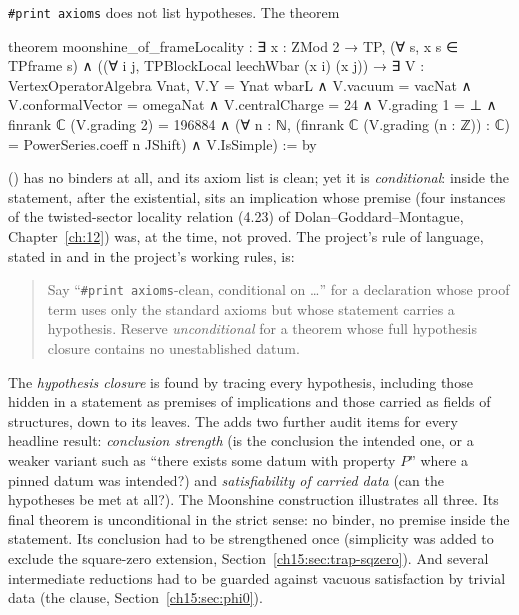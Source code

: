 \texttt{\#print axioms} does not list hypotheses. The theorem
\begin{leancode}
theorem moonshine_of_frameLocality :
    ∃ x : ZMod 2 → TP, (∀ s, x s ∈ TPframe s) ∧
      ((∀ i j, TPBlockLocal leechWbar (x i) (x j)) →
        ∃ V : VertexOperatorAlgebra Vnat,
          V.Y = Ynat wbarL ∧ V.vacuum = vacNat ∧ V.conformalVector = omegaNat ∧
          V.centralCharge = 24 ∧
          V.grading 1 = ⊥ ∧
          finrank ℂ (V.grading 2) = 196884 ∧
          (∀ n : ℕ, (finrank ℂ (V.grading (n : ℤ)) : ℂ) = PowerSeries.coeff n JShift) ∧
          V.IsSimple) := by
\end{leancode}
() has no binders at all, and its axiom list is clean; yet it is
\emph{conditional}: inside the statement, after the existential, sits an implication whose premise
 (four instances of the twisted-sector locality
relation (4.23) of Dolan--Goddard--Montague, Chapter~\ref{ch:12}) was, at the time, not proved.
The project's rule of language, stated in  and in the project's working rules, is:

\begin{quote}
Say ``\texttt{\#print axioms}-clean, conditional on \ldots'' for a declaration whose proof term uses
only the standard axioms but whose statement carries a hypothesis. Reserve \emph{unconditional} for a
theorem whose full hypothesis closure contains no unestablished datum.
\end{quote}

The \emph{hypothesis closure} is found by tracing every hypothesis, including those hidden in a
statement as premises of implications and those carried as fields of structures, down to its
leaves. The  adds two further audit items for every headline result:
\emph{conclusion strength} (is the conclusion the intended one, or a weaker variant such as
``there exists some datum with property $P$'' where a pinned datum was intended?) and
\emph{satisfiability of carried data} (can the hypotheses be met at all?). The Moonshine
construction illustrates all three. Its final theorem is unconditional in the strict sense: no
binder, no premise inside the statement. Its conclusion had to be strengthened once (simplicity was
added to exclude the square-zero extension, Section~\ref{ch15:sec:trap-sqzero}). And several
intermediate reductions had to be guarded against vacuous satisfaction by trivial data (the
 clause, Section~\ref{ch15:sec:phi0}).

